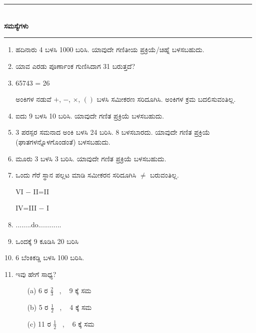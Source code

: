 \chapter{}\label{chap4}

\begin{center}
\rule{5cm}{1pt}\\[5pt]
{\Large\bfseries ಸಮಸ್ಯೆಗಳು}\\[3pt]
\rule{5cm}{1pt}
\end{center}

\smallskip
\begin{enumerate}
\renewcommand{\labelenumi}{\bf\theenumi.}
\itemsep=5pt

\item ಹದಿನಾರು 4 ಬಳಸಿ 1000 ಬರಿಸಿ. ಯಾವುದೇ ಗಣಿತೀಯ ಪ್ರಕ್ರಿಯೆ/ಚಿಹ್ನೆ ಬಳಸಬಹುದು.

\item ಯಾವ ಎರಡು ಪೂರ್ಣಾಂಕ ಗುಣಿಸಿದಾಗ 31 ಬರುತ್ತದೆ?

\item 65743 = 26

ಅಂಕಿಗಳ ನಡುವೆ $+$, $-$, $\times$, $()$ ಬಳಸಿ ಸಮೀಕರಣ ಸರಿದೂಗಿಸಿ. ಅಂಕಿಗಳ ಕ್ರಮ ಬದಲಿಸುವಂತಿಲ್ಲ.

\item ಐದು 9 ಬಳಸಿ 10 ಬರಿಸಿ. ಯಾವುದೇ ಗಣಿತ ಪ್ರಕ್ರಿಯೆ ಬಳಸಬಹುದು. 

\item 3 ಪರಸ್ಪರ ಸಮನಾದ ಅಂಕಿ ಬಳಸಿ 24 ಬರಿಸಿ. 8 ಬಳಸಬಾರದು. ಯಾವುದೇ ಗಣಿತ ಪ್ರಕ್ರಿಯೆ (ಘಾತಗಳನ್ನೊಳಗೊಂಡಂತೆ) ಬಳಸಬಹುದು.

\item ಮೂರು 3 ಬಳಸಿ 3 ಬರಿಸಿ. ಯಾವುದೇ ಗಣಿತ ಪ್ರಕ್ರಿಯೆ ಬಳಸಬಹುದು.

\item ಒಂದು ಗೆರೆ ಸ್ಥಾನ ಪಲ್ಲಟ ಮಾಡಿ ಸಮೀಕರನ ಸರಿದೂಗಿಸಿ $\neq$ ಬರುವಂತಿಲ್ಲ. 

VI $-$ II=II

IV=III $-$ I

\item ........do............

\item ಒಂದಕ್ಕೆ 9 ಕೂಡಿಸಿ 20 ಬರಿಸಿ

\item 6 ಬೆಂಕಿಕಡ್ಡಿ  ಬಳಸಿ 100 ಬರಿಸಿ. 

\item ಇವು ಹೇಗೆ ಸಾಧ್ಯ?
\begin{itemize}
\item[(a)] 6 ರ $\frac{2}{3}$~ , ~ 9 ಕ್ಕೆ ಸಮ 
\item[(b)] 5 ರ $\frac{1}{2}$~ , ~ 4 ಕ್ಕೆ ಸಮ
\item[(c)] 11 ರ $\frac{1}{2}$~ , ~ 6 ಕ್ಕೆ ಸಮ
\end{itemize}


\end{enumerate}
